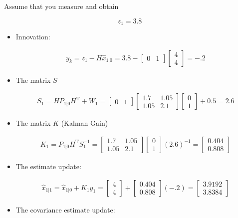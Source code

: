Assume that you measure and obtain

\[z_1 = 3.8\]

\begin{itemize}
\item
  Innovation:

  \[\begin{aligned}
  y_k = z_1 - H\hat{x}_{1|0} = 3.8 - \begin{bmatrix} 0 & 1\end{bmatrix}
  \begin{bmatrix}4 \\ 4\end{bmatrix} = -.2
  \end{aligned}\]
\item
  The matrix \(S\)

  \[\begin{aligned}
  S_1 = H P_{1|0} H^\text{T} + W_1
  = \begin{bmatrix} 0 & 1\end{bmatrix} \begin{bmatrix}1.7 & 1.05 \\ 1.05 & 2.1\end{bmatrix}
  \begin{bmatrix}0 \\ 1\end{bmatrix} +0.5 = 2.6
  \end{aligned}\]
\item
  The matrix \(K\) (Kalman Gain)

  \[\begin{aligned}
  K_1 = P_{1|0}H^\text{T}S_1^{-1} = \begin{bmatrix}1.7 & 1.05 \\ 1.05 & 2.1\end{bmatrix}
  \begin{bmatrix}0 \\ 1\end{bmatrix}
  \left( 2.6 \right)^{-1} =
  \begin{bmatrix}0.404 \\ 0.808\end{bmatrix}
  \end{aligned}\]
\item
  The estimate update:

  \[\begin{aligned}
  \hat{x}_{1|1} = \hat{x}_{1|0} + K_1 y_1 =\begin{bmatrix}4 \\ 4\end{bmatrix} +\begin{bmatrix}0.404 \\ 0.808\end{bmatrix}(-.2) = \begin{bmatrix}3.9192 \\ 3.8384 \end{bmatrix}
  \end{aligned}\]
\item
  The covariance estimate update:


\end{itemize}
